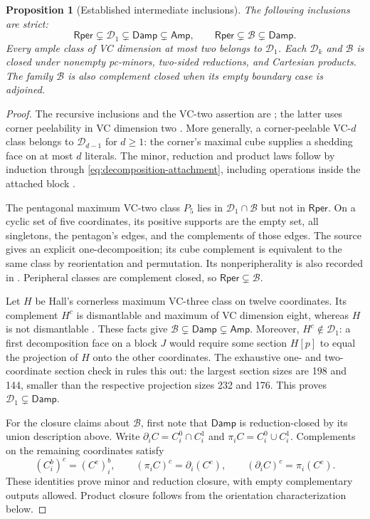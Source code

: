 \documentclass[11pt]{article}
\newtheorem{proposition}{Proposition}[section]
\theoremstyle{definition}
\newcommand{\Amp}{\mathsf{Amp}}
\newcommand{\Damp}{\mathsf{Damp}}
\newcommand{\Rper}{\mathsf{Rper}}
\begin{document}
\begin{proposition}[Established intermediate inclusions]
\label{prop:intermediate-inclusions}
The following inclusions are strict:
\[
 \Rper\subsetneq\mathcal D_1\subsetneq\Damp\subsetneq\Amp,
 \qquad \Rper\subsetneq\mathcal B\subsetneq\Damp.
\]
Every ample class of VC dimension at most two belongs to $\mathcal D_1$.
Each $\mathcal D_k$ and $\mathcal B$ is closed under nonempty pc-minors,
two-sided reductions, and Cartesian products. The family $\mathcal B$ is
also complement closed when its empty boundary case is adjoined.
\end{proposition}
\begin{proof}
The recursive inclusions and the VC-two assertion are
\cite{RecursiveClasses}; the latter uses corner peelability in VC
 dimension two \cite[Proposition~4.11]{CCMW}. More generally, a
corner-peelable VC-$d$ class belongs to $\mathcal D_{d-1}$ for $d\ge1$:
the corner's maximal cube supplies a shedding face on at most $d$ literals.
The minor, reduction and product laws follow by induction through
\eqref{eq:decomposition-attachment}, including operations inside the
attached block \cite{RecursiveClosure}.

The pentagonal maximum VC-two class $P_5$ lies in
$\mathcal D_1\cap\mathcal B$ but not in $\Rper$. On a cyclic set of
five coordinates, its positive supports are the empty set, all singletons,
the pentagon's edges, and the complements of those edges.
The source \cite{RecursiveClasses} gives an explicit one-decomposition;
its cube complement is equivalent to the same class by reorientation
and permutation. Its nonperipherality is also recorded in \cite{Cover}.
Peripheral classes are complement closed, so $\Rper\subsetneq\mathcal B$.

Let $H$ be Hall's cornerless maximum VC-three class on twelve coordinates.
Its complement $H^c$ is dismantlable and maximum of VC dimension eight,
whereas $H$ is not dismantlable \cite{RecursiveClasses,OrientationClasses}.
These facts give $\mathcal B\subsetneq\Damp\subsetneq\Amp$.
Moreover, $H^c\notin\mathcal D_1$: a first decomposition face on a
block $J$ would require some section $H[p]$ to equal the projection of
$H$ onto the other coordinates. The exhaustive one- and two-coordinate
section check in \cite{RecursiveClosure} rules this out: the largest
section sizes are 198 and 144, smaller than the respective projection
sizes 232 and 176. This proves $\mathcal D_1\subsetneq\Damp$.

For the closure claims about $\mathcal B$, first note that $\Damp$ is
reduction-closed by its union description above. Write
$\partial_i C=C_i^0\cap C_i^1$ and $\pi_i C=C_i^0\cup C_i^1$.
Complements on the remaining coordinates satisfy
\[
 (C_i^b)^c=(C^c)_i^b,\qquad
 (\pi_i C)^c=\partial_i(C^c),\qquad
 (\partial_i C)^c=\pi_i(C^c).
\]
These identities prove minor and reduction closure, with empty
complementary outputs allowed. Product closure follows from the
orientation characterization below.
\end{proof}
\end{document}
